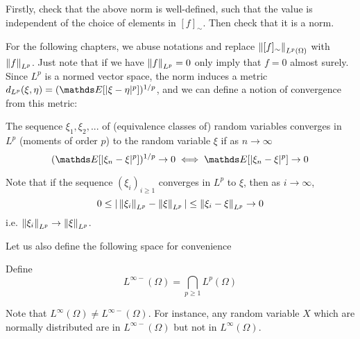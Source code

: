 \begin{unexaminable}
\begin{exercise}
Firstly, check that the above norm is well-defined, such that the value is independent of the choice of elements in $[f]_\sim$. Then check that it is a norm.
\end{exercise}
\end{unexaminable}

For the following chapters, we abuse notations and replace $\left\| [f]_\sim \right\|_{L^p(\Omega)}$ with $\left\| f \right\|_{L^p}$. Just note that if we have $\left\| f \right\|_{L^p} = 0$ only imply that $f = 0$ almost surely. Since $L^p$ is a normed vector space, the norm induces a metric $d_{L^p}(\xi,\eta) = (\E[|\xi - \eta|^p])^{1/p}$, and we can define a notion of convergence from this metric:

\begin{definition}[$L^p$ convergence] \label{def:Lp_convergence} The sequence $\xi_1,\xi_2,...$ of (equivalence classes of) random variables converges in $L^p$ (moments of order $p$) to the random variable $\xi$ if as $n \to \infty$
\begin{equation}
    (\E[|\xi_n - \xi|^p])^{1/p} \to 0 \iff \E[|\xi_n - \xi|^p] \to 0
\end{equation}
\end{definition}

\begin{remark} Note that if the sequence $(\xi_i)_{i\geq 1}$ converges in $L^p$ to $\xi$, then as $i \to \infty$,
\begin{equation}
    0 \leq |\left\| \xi_i \right\|_{L^p} - \left\| \xi \right\|_{L^p}| \leq \left\| \xi_i - \xi \right\|_{L^p} \to 0
\end{equation}
i.e. $\left\| \xi_i \right\|_{L^p} \to \left\| \xi \right\|_{L^p}$.
\end{remark}

\begin{unexaminable}
Let us also define the following space for convenience
\begin{definition} Define 
\begin{equation}
    L^{\infty-}(\Omega) = \bigcap_{p \geq 1} L^p(\Omega)
\end{equation}

Note that $L^\infty(\Omega) \neq L^{\infty-}(\Omega)$. For instance, any random variable $X$ which are normally distributed are in $L^{\infty-}(\Omega)$ but not in $L^\infty(\Omega)$.
\end{definition}
\end{unexaminable}

